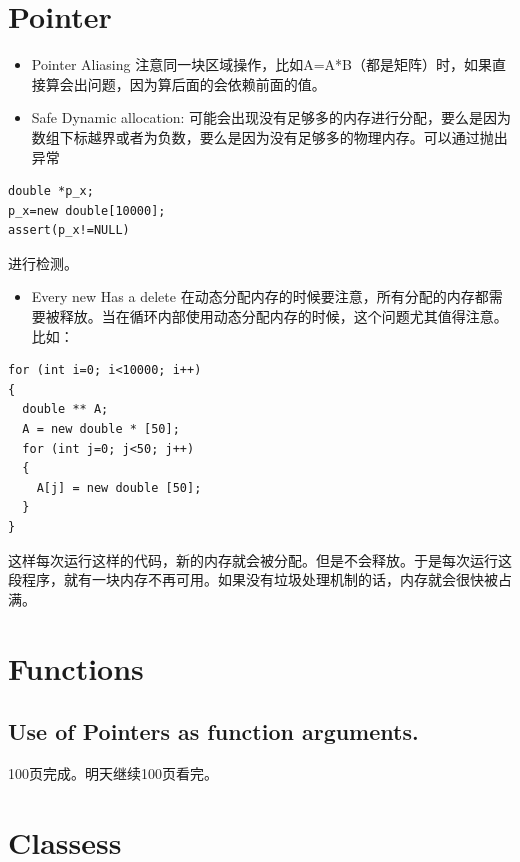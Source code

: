 \documentclass[
]{book}
\providecommand{\tightlist}{%
  \setlength{\itemsep}{0pt}\setlength{\parskip}{0pt}}
\theoremstyle{definition}
\theoremstyle{definition}
\theoremstyle{definition}
\theoremstyle{remark}
\begin{document}
\hypertarget{pointer}{%
\section{Pointer}\label{pointer}}

\begin{itemize}
\item
  Pointer Aliasing 注意同一块区域操作，比如A=A*B（都是矩阵）时，如果直接算会出问题，因为算后面的会依赖前面的值。
\item
  Safe Dynamic allocation: 可能会出现没有足够多的内存进行分配，要么是因为数组下标越界或者为负数，要么是因为没有足够多的物理内存。可以通过抛出异常
\end{itemize}

\begin{verbatim}
double *p_x;
p_x=new double[10000];
assert(p_x!=NULL)
\end{verbatim}

进行检测。

\begin{itemize}
\tightlist
\item
  Every new Has a delete
  在动态分配内存的时候要注意，所有分配的内存都需要被释放。当在循环内部使用动态分配内存的时候，这个问题尤其值得注意。比如：
\end{itemize}

\begin{verbatim}
for (int i=0; i<10000; i++) 
{ 
  double ** A; 
  A = new double * [50]; 
  for (int j=0; j<50; j++) 
  {
    A[j] = new double [50]; 
  } 
}
\end{verbatim}

这样每次运行这样的代码，新的内存就会被分配。但是不会释放。于是每次运行这段程序，就有一块内存不再可用。如果没有垃圾处理机制的话，内存就会很快被占满。

\hypertarget{functions}{%
\section{Functions}\label{functions}}

\hypertarget{use-of-pointers-as-function-arguments.}{%
\subsection{Use of Pointers as function arguments.}\label{use-of-pointers-as-function-arguments.}}

100页完成。明天继续100页看完。

\hypertarget{classess}{%
\section{Classess}\label{classess}}
\end{document}
